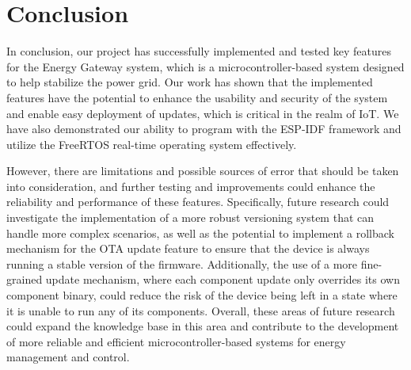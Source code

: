 \section{Conclusion}
\label{sec:conclusion}

In conclusion, our project has successfully implemented and tested key features for the Energy Gateway system, which is a microcontroller-based system designed to help stabilize the power grid. Our work has shown that the implemented features have the potential to enhance the usability and security of the system and enable easy deployment of updates, which is critical in the realm of IoT. We have also demonstrated our ability to program with the ESP-IDF framework and utilize the FreeRTOS real-time operating system effectively.

However, there are limitations and possible sources of error that should be taken into consideration, and further testing and improvements could enhance the reliability and performance of these features. Specifically, future research could investigate the implementation of a more robust versioning system that can handle more complex scenarios, as well as the potential to implement a rollback mechanism for the OTA update feature to ensure that the device is always running a stable version of the firmware. Additionally, the use of a more fine-grained update mechanism, where each component update only overrides its own component binary, could reduce the risk of the device being left in a state where it is unable to run any of its components. Overall, these areas of future research could expand the knowledge base in this area and contribute to the development of more reliable and efficient microcontroller-based systems for energy management and control.